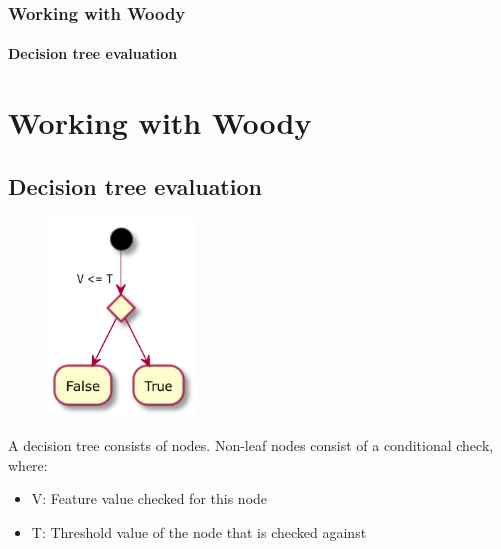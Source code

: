 \documentclass[12pt,t]{beamer}
\begin{document}
\begin{frame}
  \frametitle{Working with Woody}
  \framesubtitle{Decision tree evaluation}
\section{Working with Woody}

\subsection{Decision tree evaluation}


\begin{figure}
\centering
\includegraphics[width=0.35\textwidth]{decision_node}
\end{figure}
A decision tree consists of nodes.
Non-leaf nodes consist of a conditional check, where:
\begin{itemize}
\item V: Feature value checked for this node
\item T: Threshold value of the node that is checked against
\end{itemize}



\end{frame}
\end{document}
